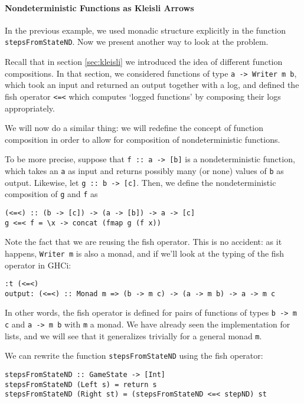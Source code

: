\documentclass[11pt]{article}
\theoremstyle{nonumberplain}
\newcommand*\lsin{\lstinline}
\begin{document}
\paragraph{Nondeterministic Functions as Kleisli Arrows}

In the previous example, we used monadic structure explicitly in the function \lsin|stepsFromStateND|. Now we present another way to look at the problem.

Recall that in section \ref{sec:kleisli} we introduced the idea of different function compositions. In that section, we considered functions of type \lsin|a -> Writer m b|, which took an input and returned an output together with a log, and defined the fish operator \lsin|<=<| which computes `logged functions' by composing their logs appropriately.

We will now do a similar thing: we will redefine the concept of function composition in order to allow for composition of nondeterministic functions.

To be more precise, suppose that \lsin|f :: a -> [b]| is a nondeterministic function, which takes an \lsin|a| as input and returns possibly many (or none) values of \lsin|b| as output. Likewise, let \lsin|g :: b -> [c]|. Then, we define the nondeterministic composition of \lsin|g| and \lsin|f| as
\begin{lstlisting}
(<=<) :: (b -> [c]) -> (a -> [b]) -> a -> [c]
g <=< f = \x -> concat (fmap g (f x))
\end{lstlisting}

Note the fact that we are reusing the fish operator. This is no accident: as it happens, \lsin|Writer m| is also a monad, and if we'll look at the typing of the fish operator in GHCi:
\begin{lstlisting}
:t (<=<)
output: (<=<) :: Monad m => (b -> m c) -> (a -> m b) -> a -> m c
\end{lstlisting}

In other words, the fish operator is defined for pairs of functions of types \lsin|b -> m c| and \lsin|a -> m b| with \lsin|m| a monad. We have already seen the implementation for lists, and we will see that it generalizes trivially for a general monad \lsin|m|.

We can rewrite the function \lsin|stepsFromStateND| using the fish operator:
\begin{lstlisting}
stepsFromStateND :: GameState -> [Int]
stepsFromStateND (Left s) = return s
stepsFromStateND (Right st) = (stepsFromStateND <=< stepND) st
\end{lstlisting}
\end{document}
